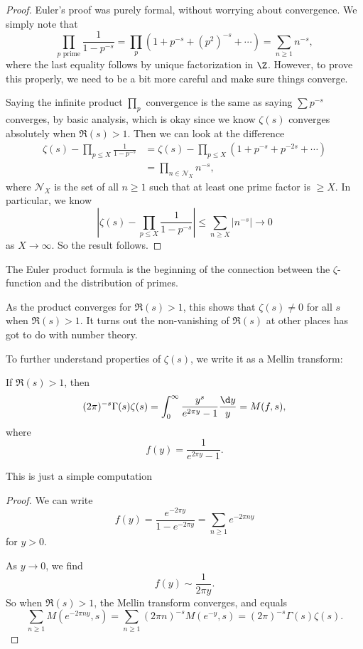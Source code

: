 \documentclass[a4paper]{article}
\begin{document}
\begin{proof}
  Euler's proof was purely formal, without worrying about convergence. We simply note that
  \[
    \prod_{p\text{ prime}} \frac{1}{1 - p^{-s}} = \prod_p (1 + p^{-s} + (p^2)^{-s} + \cdots) = \sum_{n \geq 1} n^{-s},
  \]
  where the last equality follows by unique factorization in $\Z$. However, to prove this properly, we need to be a bit more careful and make sure things converge.

  Saying the infinite product $\prod_p$ convergence is the same as saying $\sum p^{-s}$ converges, by basic analysis, which is okay since we know $\zeta(s)$ converges absolutely when $\Re(s) > 1$. Then we can look at the difference
  \begin{align*}
    \zeta(s) - \prod_{p \leq X} \frac{1}{1 - p^{-s}} &= \zeta(s) - \prod_{p \leq X} (1 + p^{-s} + p^{-2s} + \cdots)\\
    &= \prod_{n \in \mathcal{N}_X} n^{-s},
  \end{align*}
  where $\mathcal{N}_X$ is the set of all $n \geq 1$ such that at least one prime factor is $\geq X$. In particular, we know
  \[
    \left|\zeta(s) - \prod_{p \leq X} \frac{1}{1 - p^{-s}}\right| \leq \sum_{n \geq X} |n^{-s}| \to 0
  \]
  as $X \to \infty$. So the result follows.
\end{proof}
The Euler product formula is the beginning of the connection between the $\zeta$-function and the distribution of primes.

As the product converges for $\Re(s) > 1$, this shows that $\zeta(s) \not= 0$ for all $s$ when $\Re(s) > 1$. It turns out the non-vanishing of $\Re(s)$ at other places has got to do with number theory.

To further understand properties of $\zeta(s)$, we write it as a Mellin transform:
\begin{thm}
  If $\Re(s) > 1$, then
  \[
    (2\pi)^{-s} \Gamma(s) \zeta(s) = \int_0^\infty \frac{y^s}{e^{2\pi y} - 1} \frac{\d y}{y} = M(f, s),
  \]
  where
  \[
    f(y) = \frac{1}{e^{2 \pi y} - 1}.
  \]
\end{thm}
This is just a simple computation

\begin{proof}
  We can write
  \[
    f(y) = \frac{e^{-2\pi y}}{1 - e^{-2 \pi y}} = \sum_{n \geq 1} e^{-2\pi n y}
  \]
  for $y > 0$.

  As $y \to 0$, we find
  \[
    f(y) \sim \frac{1}{2\pi y}.
  \]
  So when $\Re(s) > 1$, the Mellin transform converges, and equals
  \[
    \sum_{n \geq 1} M(e^{-2\pi n y}, s) = \sum_{n \geq 1} (2\pi n)^{-s} M(e^{-y}, s) = (2\pi)^{-s} \Gamma(s) \zeta(s).
  \]
\end{proof}
\end{document}
